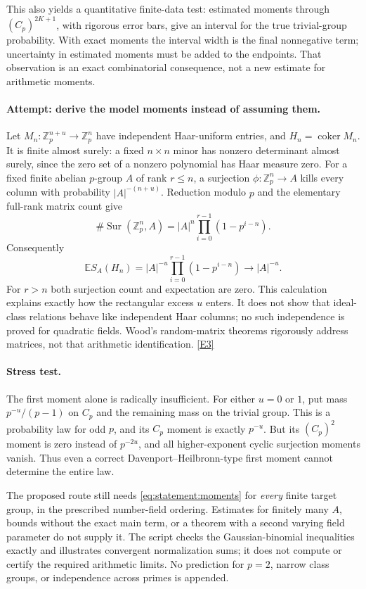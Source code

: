 \documentclass[11pt,a4paper]{article}
\newcommand{\Z}{\mathbb{Z}}
\newcommand{\E}{\mathbb{E}}
\newcommand{\eref}[2]{\hyperlink{extra:#1:#2}{[E#2]}}
\numberwithin{equation}{section}
\begin{document}
This also yields a quantitative finite-data test: estimated moments through
$(C_p)^{2K+1}$, with rigorous error bars, give an interval for the true
trivial-group probability. With exact moments the interval width is the final nonnegative term;
uncertainty in estimated moments must be added to the endpoints. That observation is an exact combinatorial consequence, not a
new estimate for arithmetic moments.

\paragraph{Attempt: derive the model moments instead of assuming them.}
Let $M_n:\Z_p^{n+u}\to\Z_p^n$ have independent Haar-uniform entries,
and $H_n=\operatorname{coker}M_n$. It is finite almost surely: a fixed
$n\times n$ minor has nonzero determinant almost surely, since the zero
set of a nonzero polynomial has Haar measure zero. For a fixed finite
abelian $p$-group $A$ of rank $r\leq n$, a surjection
$\phi:\Z_p^n\to A$ kills every column with probability
$|A|^{-(n+u)}$. Reduction modulo $p$ and the elementary full-rank matrix
count give
\[
 \#\operatorname{Sur}(\Z_p^n,A)
 =|A|^n\prod_{i=0}^{r-1}(1-p^{i-n}).
\]
Consequently
\begin{equation}\label{eq:statement:Haar}
 \E S_A(H_n)=|A|^{-u}\prod_{i=0}^{r-1}(1-p^{i-n})
 \longrightarrow |A|^{-u}.
\end{equation}
For $r>n$ both surjection count and expectation are zero. This calculation
explains exactly how the rectangular excess $u$ enters. It does not show
that ideal-class relations behave like independent Haar columns; no
such independence is proved for quadratic fields. Wood's random-matrix
theorems rigorously address matrices, not that arithmetic identification.
\eref{statement}{3}

\paragraph{Stress test.}
The first moment alone is radically insufficient. For either $u=0$ or $1$,
put mass $p^{-u}/(p-1)$ on $C_p$ and the remaining mass on the trivial
group. This is a probability law for odd $p$, and its $C_p$ moment is
exactly $p^{-u}$. But its $(C_p)^2$ moment is zero instead of $p^{-2u}$,
and all higher-exponent cyclic surjection moments vanish. Thus even a
correct Davenport--Heilbronn-type first moment cannot determine the
entire law.

The proposed route still needs \eqref{eq:statement:moments} for \emph{every}
finite target group, in the prescribed number-field ordering. Estimates
for finitely many $A$, bounds without the exact main term, or a theorem
with a second varying field parameter do not supply it. The script checks
the Gaussian-binomial inequalities exactly and illustrates convergent
normalization sums; it does not compute or certify the required arithmetic
limits. No prediction for $p=2$, narrow class groups, or independence
across primes is appended.
\end{document}

